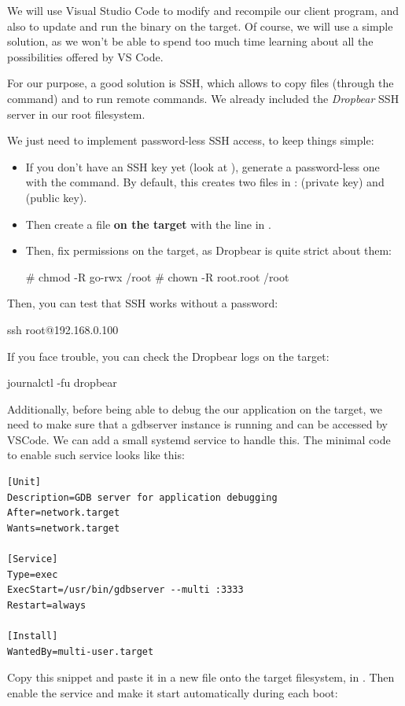 We will use Visual Studio Code to modify and recompile our client
program, and also to update and run the binary on the target.
Of course, we will use a simple solution, as we won't be able to
spend too much time learning about all the possibilities offered
by VS Code.

For our purpose, a good solution is SSH, which allows to copy files
(through the  command) and to run remote commands. We already
included the {\em Dropbear} SSH server in our root filesystem.

We just need to implement password-less SSH access, to keep things
simple:

\begin{itemize}
  \item If you don't have an SSH key yet (look at ),
	generate a password-less one with the  command.
	By default, this creates two files in :
	 (private key) and  (public key).
  \item Then create a  file {\bf on the target}
        with the line in .
  \item Then, fix permissions on the target, as Dropbear is quite strict
        about them:
        \begin{bashinput}
# chmod -R go-rwx /root
# chown -R root.root /root
        \end{bashinput}
\end{itemize}

Then, you can test that SSH works without a password:

\begin{bashinput}
ssh root@192.168.0.100
\end{bashinput}

If you face trouble, you can check the Dropbear logs on the target:

\begin{bashinput}
journalctl -fu dropbear
\end{bashinput}

Additionally, before being able to debug the our application on the target, we
need to make sure that a gdbserver instance is running and can be accessed
by VSCode. We can add a small systemd service to handle this. The minimal
code to enable such service looks like this:
\begin{verbatim}
[Unit]
Description=GDB server for application debugging
After=network.target
Wants=network.target

[Service]
Type=exec
ExecStart=/usr/bin/gdbserver --multi :3333
Restart=always

[Install]
WantedBy=multi-user.target
\end{verbatim}
Copy this snippet and paste it in a new  file onto
the target filesystem, in . Then enable the
service and make it start automatically during each boot:

